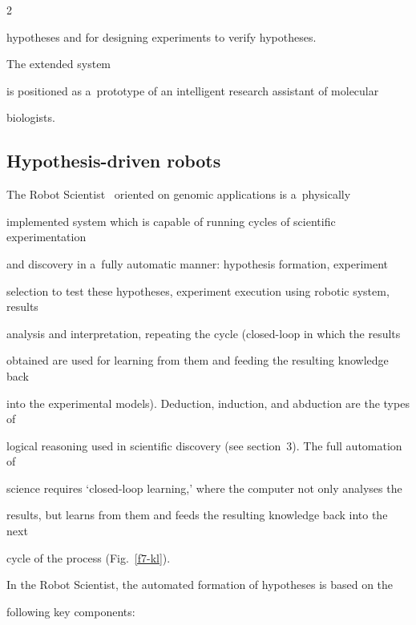 \begin{multicols}{2}
\begin{enumerate}[(1)]
hypotheses and for designing experiments to verify hypotheses.


\end{enumerate}


 The extended system


is positioned as a~prototype of an intelligent research assistant of molecular


biologists.





\subsection{Hypothesis-driven robots}





\noindent


  The Robot Scientist~\cite{53-kl} oriented on genomic applications is a~physically


implemented system which is capable of running cycles of scientific experimentation


and discovery in a~fully automatic manner: hypothesis formation, experiment


selection to test these hypotheses, experiment execution using robotic system, results


analysis and interpretation, repeating the cycle  (closed-loop in which the results


obtained are used for learning from them and feeding the resulting knowledge back


into the experimental models). Deduction, induction, and abduction are the types of


logical reasoning used in scientific discovery (see section~3). The full automation of


science requires `closed-loop learning,' where the computer not only analyses the


results, but learns from them and feeds the resulting knowledge back into the next


cycle of the process (Fig.~\ref{f7-kl}).





  In the Robot Scientist, the automated formation of hypotheses is based on the


following key components:


  \begin{enumerate}[(1)]



\end{enumerate}
\end{multicols}
